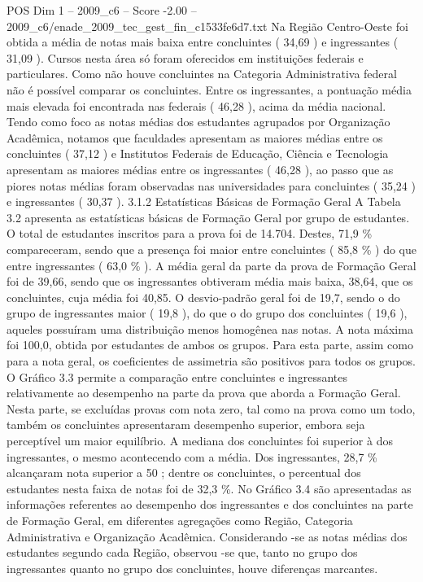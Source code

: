 \begin{textsample}{POS Dim 1 – 2009\_c6 – Score -2.00 – 2009\_c6/enade\_2009\_tec\_gest\_fin\_c1533fe6d7.txt}
Na Região Centro-Oeste foi obtida a média de notas mais baixa entre concluintes ( 34,69 ) e ingressantes ( 31,09 ).
Cursos nesta área só foram oferecidos em instituições federais e particulares.
Como não houve concluintes na Categoria Administrativa federal não é possível comparar os concluintes.
Entre os ingressantes, a pontuação média mais elevada foi encontrada nas federais ( 46,28 ), acima da média nacional.
Tendo como foco as notas médias dos estudantes agrupados por Organização Acadêmica, notamos que faculdades apresentam as maiores médias entre os concluintes ( 37,12 ) e Institutos Federais de Educação, Ciência e Tecnologia apresentam as maiores médias entre os ingressantes ( 46,28 ), ao passo que as piores notas médias foram observadas nas universidades para concluintes ( 35,24 ) e ingressantes ( 30,37 ). 3.1.2 Estatísticas Básicas de Formação Geral A Tabela 3.2 apresenta as estatísticas básicas de Formação Geral por grupo de estudantes.
O total de estudantes inscritos para a prova foi de 14.704.
Destes, 71,9 \% compareceram, sendo que a presença foi maior entre concluintes ( 85,8 \% ) do que entre ingressantes ( 63,0 \% ).
A média geral da parte da prova de Formação Geral foi de 39,66, sendo que os ingressantes obtiveram média mais baixa, 38,64, que os concluintes, cuja média foi 40,85.
O desvio-padrão geral foi de 19,7, sendo o do grupo de ingressantes maior ( 19,8 ), do que o do grupo dos concluintes ( 19,6 ), aqueles possuíram uma distribuição menos homogênea nas notas.
A nota máxima foi 100,0, obtida por estudantes de ambos os grupos.
Para esta parte, assim como para a nota geral, os coeficientes de assimetria são positivos para todos os grupos.
O Gráfico 3.3 permite a comparação entre concluintes e ingressantes relativamente ao desempenho na parte da prova que aborda a Formação Geral.
Nesta parte, se excluídas provas com nota zero, tal como na prova como um todo, também os concluintes apresentaram desempenho superior, embora seja perceptível um maior equilíbrio.
A mediana dos concluintes foi superior à dos ingressantes, o mesmo acontecendo com a média.
Dos ingressantes, 28,7 \% alcançaram nota superior a 50 ; dentre os concluintes, o percentual dos estudantes nesta faixa de notas foi de 32,3 \%.
No Gráfico 3.4 são apresentadas as informações referentes ao desempenho dos ingressantes e dos concluintes na parte de Formação Geral, em diferentes agregações como Região, Categoria Administrativa e Organização Acadêmica.
Considerando -se as notas médias dos estudantes segundo cada Região, observou -se que, tanto no grupo dos ingressantes quanto no grupo dos concluintes, houve diferenças marcantes.

\end{textsample}
